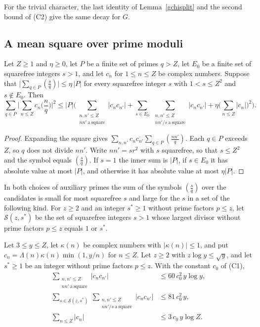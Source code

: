 For the trivial character, the last identity of Lemma~\ref{gchisplit} and the second bound of (C2) give the same decay for $G$.

\subsection{A mean square over prime moduli}

\begin{proposition}\label{meansq}
Let $Z\ge1$ and $\eta\ge0$, let $P$ be a finite set of primes $q>Z$, let $E_0$ be a finite set of squarefree integers $s>1$, and let $c_n$ for $1\le n\le Z$ be complex numbers. Suppose that $\lvert\sum_{q\in P}(\frac sq)\rvert\le\eta\,\lvert P\rvert$ for every squarefree integer $s$ with $1<s\le Z^2$ and $s\notin E_0$. Then
\[
\sum_{q\in P}\Big\lvert\sum_{n\le Z}c_n\Big(\frac nq\Big)\Big\rvert^2\le\lvert P\rvert\Big(\sum_{\substack{n,n'\le Z\\ nn'\ \mathrm{a\ square}}}\lvert c_nc_{n'}\rvert+\sum_{s\in E_0}\ \sum_{\substack{n,n'\le Z\\ nn'/s\ \mathrm{a\ square}}}\lvert c_nc_{n'}\rvert+\eta\Big(\sum_{n\le Z}\lvert c_n\rvert\Big)^2\Big).
\]
\end{proposition}

\begin{proof}
Expanding the square gives $\sum_{n,n'}c_n\overline{c_{n'}}\sum_{q\in P}(\frac{nn'}q)$. Each $q\in P$ exceeds $Z$, so $q$ does not divide $nn'$. Write $nn'=sr^2$ with $s$ squarefree, so that $s\le Z^2$ and the symbol equals $(\frac sq)$. If $s=1$ the inner sum is $\lvert P\rvert$, if $s\in E_0$ it has absolute value at most $\lvert P\rvert$, and otherwise it has absolute value at most $\eta\lvert P\rvert$.
\end{proof}

In both choices of auxiliary primes the sum of the symbols $(\frac sq)$ over the candidates is small for most squarefree $s$ and large for the $s$ in a set of the following kind. For $z\ge2$ and an integer $s^\ast\ge1$ without prime factors $p\le z$, let $\mathcal S(z,s^\ast)$ be the set of squarefree integers $s>1$ whose largest divisor without prime factors $p\le z$ equals $1$ or $s^\ast$.

\begin{lemma}\label{coef}
Let $3\le y\le Z$, let $\kappa(n)$ be complex numbers with $\lvert\kappa(n)\rvert\le1$, and put $c_n=\Lambda(n)\kappa(n)\min(1,y/n)$ for $n\le Z$. Let $z\ge2$ with $z\log y\le\sqrt y$, and let $s^\ast\ge1$ be an integer without prime factors $p\le z$. With the constant $c_0$ of \textup{(C1)},
\begin{align*}
\sum_{\substack{n,n'\le Z\\ nn'\ \mathrm{a\ square}}}\lvert c_nc_{n'}\rvert&\le60\,c_0^2\,y\log y,\\
\sum_{s\in\mathcal S(z,s^\ast)}\ \sum_{\substack{n,n'\le Z\\ nn'/s\ \mathrm{a\ square}}}\lvert c_nc_{n'}\rvert&\le81\,c_0^2\,y,\\
\sum_{n\le Z}\lvert c_n\rvert&\le3\,c_0\,y\log Z .
\end{align*}
\end{lemma}

